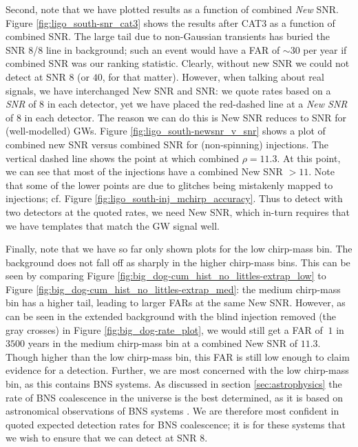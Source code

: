 Second, note that we have plotted results as a function of combined \emph{New}
\ac{SNR}. Figure \ref{fig:ligo_south-snr_cat3} shows the results after CAT3 as
a function of combined \ac{SNR}. The large tail due to non-Gaussian transients
has buried the \ac{SNR} 8/8 line in background; such an event would have a
\ac{FAR} of $\sim30$ per year if combined \ac{SNR} was our ranking statistic.
Clearly, without new \ac{SNR} we could not detect at \ac{SNR} $8$ (or $40$, for
that matter). However, when talking about real signals, we have interchanged
New \ac{SNR} and \ac{SNR}: we quote rates based on a \emph{\ac{SNR}} of $8$ in
each detector, yet we have placed the red-dashed line at a \emph{New \ac{SNR}}
of $8$ in each detector. The reason we can do this is New \ac{SNR} reduces to
\ac{SNR} for (well-modelled) \acp{GW}. Figure \ref{fig:ligo_south-newsnr_v_snr}
shows a plot of combined new \ac{SNR} versus combined \ac{SNR} for
(non-spinning) injections. The vertical dashed line shows the point at which
combined $\rho = 11.3$. At this point, we can see that most of the injections
have a combined New \ac{SNR} $> 11$. Note that some of the lower points are due
to glitches being mistakenly mapped to injections; cf. Figure
\ref{fig:ligo_south-inj_mchirp_accuracy}. Thus to detect with two detectors at
the quoted rates, we need New \ac{SNR}, which in-turn requires that we have
templates that match the \ac{GW} signal well.

Finally, note that we have so far only shown plots for the low chirp-mass bin.
The background does not fall off as sharply in the higher chirp-mass bins. This
can be seen by comparing Figure
\ref{fig:big_dog-cum_hist_no_littles-extrap_low} to Figure
\ref{fig:big_dog-cum_hist_no_littles-extrap_med}: the medium chirp-mass bin has
a higher tail, leading to larger \acp{FAR} at the same New \ac{SNR}. However,
as can be seen in the extended background with the blind injection removed (the
gray crosses) in Figure \ref{fig:big_dog-rate_plot}, we would still get a
\ac{FAR} of $~1$ in $3500$ years in the medium chirp-mass bin at a combined New
\ac{SNR} of $11.3$.  Though higher than the low chirp-mass bin, this \ac{FAR}
is still low enough to claim evidence for a detection. Further, we are most
concerned with the low chirp-mass bin, as this contains \ac{BNS} systems. As
discussed in section \ref{sec:astrophysics} the rate of \ac{BNS} coalescence in
the universe is the best determined, as it is based on astronomical
observations of \ac{BNS} systems \cite{ratesdoc}. We are therefore most
confident in quoted expected detection rates for \ac{BNS} coalescence; it is
for these systems that we wish to ensure that we can detect at \ac{SNR} 8.

